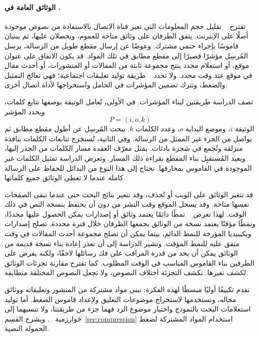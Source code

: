 \paragraph{الوثائق العامة في .}
تقترح ~\cite{zillien2024oppression} تقليل حجم المعلومات التي تعبر قناة الاتصال بالاستفادة من نصوص موجودة أصلًا على الإنترنت.
يتفق الطرفان على وثائق متاحة للعموم، ويحصلان عليها، ثم يبنيان قاموسًا بإجراء حتمي مشترك. وعوضًا عن إرسال مقطع طويل من الرسالة، يرسل المُرسِل مؤشرًا قصيرًا إلى مقطع مطابق في تلك المواد.
قد يكون الاتفاق على عنوان موقع، أو استعلام محدد ينتج مجموعة ثابتة من المقالات أو المنشورات، أو أحدث مقال في موقع عند وقت محدد.
ولا تحدد ~\cite{zillien2024oppression} طريقة توليد تعليقات اجتماعية؛ فهي تعالج التمثيل والضغط، وتترك تضمين المؤشرات في الحامل واستخراجها لأداة اتصال أخرى.

تصف الدراسة طريقتين لبناء المؤشرات. في الأولى، تُعامل الوثيقة بوصفها تتابع كلمات، ويحدد المؤشر
\[
P=(i,o,k)
\]
الوثيقة $i$، وموضع البداية $o$، وعدد الكلمات $k$. يبحث المُرسِل عن أطول مقطع مطابق ثم يواصل من الجزء غير الممثل من الرسالة.
وفي الثانية، تُستخرج تتابعات الكلمات بنافذة منزلقة وتُجمع في شجرة بادئات. يمثل معرّف العقدة مسار الكلمات من الجذر إليها، ويعيد المُستقبِل بناء المقطع بقراءة ذلك المسار.
وتعرض الدراسة تمثيل الكلمات غير الموجودة في القاموس بمحارفها. نحتاج إلى هذا النوع من البدائل للحفاظ على الرسالة كاملة عندما لا تغطي الوثائق جميع كلماتها.

قد تتغير الوثائق على الويب أو تُحذف، وقد تتغير نتائج البحث حتى عندما تبقى الصفحات نفسها متاحة. وقد يسجل الموقع وقت النشر من دون أن يحتفظ بنسخة النص في ذلك الوقت.
لهذا تعرض ~\cite{zillien2024oppression} نمطًا دائمًا  يعتمد وثائق أو إصدارات يمكن الحصول عليها مجددًا، ونمطًا مؤقتًا  يعتمد نسخة من الوثائق يجمعها الطرفان خلال فترة محددة.
تصلح إصدارات ويكيبيديا المؤرخة للنمط الدائم، بينما يمكن أن تصلح مجموعة أحدث المقالات في وقت متفق عليه للنمط المؤقت.
وتشير الدراسة إلى أن تعذر إعادة بناء نسخة قديمة من الوثائق يمكن أن يحد من قدرة المراقب على فك رسائلها لاحقًا، ولكنه يفرض على الطرفين بناء القاموس المناسب في الوقت المطلوب.
كما تقترح مقارنة تجزئات الوثائق لكشف تغيرها. تكشف التجزئة اختلاف النصوص، ولا تجعل النصوص المختلفة متطابقة.

نقدم تكييفًا أوليًا مبسطًا لهذه الفكرة: نبني مواد مشتركة من المنشور وتعليقاته ووثائق مجاله، ونستخدمها لاستخراج موضوعات التعليق ولإعداد قاموس الضغط.
أما توليد استعلامات البحث بالنموذج واختيار موضوع الرد فهما جزء من طريقتنا، ولا ننسبهما إلى خوارزمية ~\cite{zillien2024oppression}.
ويشرح القسم~\ref{sec:compression} استخدام المواد المشتركة لضغط الحمولة النصية.

